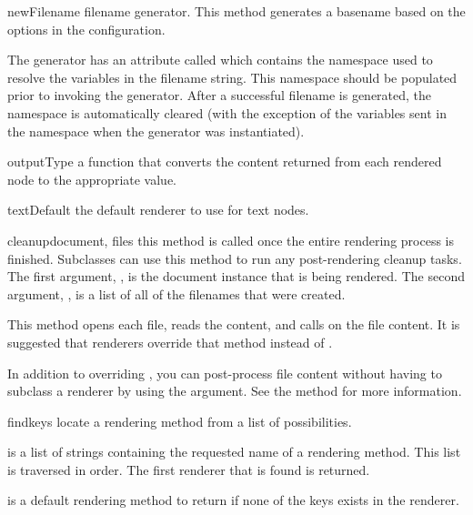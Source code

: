 \begin{memberdesc}[Renderer]{newFilename}
filename generator.  This method generates a basename based on the options
in the configuration.  

The generator has an attribute called  which contains the
namespace used to resolve the variables in the filename string.  This
namespace should be populated prior to invoking the generator.  After
a successful filename is generated, the namespace is automatically cleared
(with the exception of the variables sent in the namespace when the 
generator was instantiated).

\end{memberdesc}

\begin{memberdesc}[Renderer]{outputType}
a function that converts the content returned from each rendered
node to the appropriate value.
\end{memberdesc}

\begin{memberdesc}[Renderer]{textDefault}
the default renderer to use for text nodes.
\end{memberdesc}


\begin{methoddesc}[Renderer]{cleanup}{document, files}
this method is called once the entire rendering process is finished.  
Subclasses can use this method to run any post-rendering cleanup tasks.
The first argument, , is the document instance that is
being rendered.  The second argument, , is a list of all of the
filenames that were created.

This method opens each file, reads the content, and 
calls  on the file content.  It is suggested
that renderers override that method instead of .

In addition to overriding , you can post-process
file content without having to subclass a renderer by using the 
 argument.  See the  method for more information.
\end{methoddesc}

\begin{methoddesc}[Renderer]{find}{keys}
locate a rendering method from a list of possibilities.  

 is a list of strings containing the requested name of a
rendering method.  This list is traversed in order.  The first renderer
that is found is returned.

 is a default rendering method to return if none of the keys
exists in the renderer.
\end{methoddesc}

